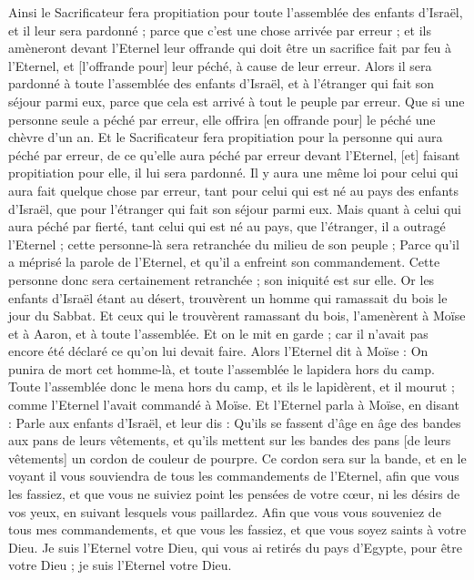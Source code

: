 \begin{multicols}{2}
Ainsi le Sacrificateur fera propitiation pour toute l'assemblée des enfants d'Israël, et il leur sera pardonné ; parce que c'est une chose arrivée par erreur ; et ils amèneront devant l'Eternel leur offrande qui doit être un sacrifice fait par feu à l'Eternel, et [l'offrande pour] leur péché, à cause de leur erreur.
Alors il sera pardonné à toute l'assemblée des enfants d'Israël, et à l'étranger qui fait son séjour parmi eux, parce que cela est arrivé à tout le peuple par erreur.
Que si une personne seule a péché par erreur, elle offrira [en offrande pour] le péché une chèvre d'un an.
Et le Sacrificateur fera propitiation pour la personne qui aura péché par erreur, de ce qu'elle aura péché par erreur devant l'Eternel, [et] faisant propitiation pour elle, il lui sera pardonné.
Il y aura une même loi pour celui qui aura fait quelque chose par erreur, tant pour celui qui est né au pays des enfants d'Israël, que pour l'étranger qui fait son séjour parmi eux.
Mais quant à celui qui aura péché par fierté, tant celui qui est né au pays, que l'étranger, il a outragé l'Eternel ; cette personne-là sera retranchée du milieu de son peuple ;
Parce qu'il a méprisé la parole de l'Eternel, et qu'il a enfreint son commandement. Cette personne donc sera certainement retranchée ; son iniquité est sur elle.
Or les enfants d'Israël étant au désert, trouvèrent un homme qui ramassait du bois le jour du Sabbat.
Et ceux qui le trouvèrent ramassant du bois, l'amenèrent à Moïse et à Aaron, et à toute l'assemblée.
Et on le mit en garde ; car il n'avait pas encore été déclaré ce qu'on lui devait faire.
Alors l'Eternel dit à Moïse : On punira de mort cet homme-là, et toute l'assemblée le lapidera hors du camp.
Toute l'assemblée donc le mena hors du camp, et ils le lapidèrent, et il mourut ; comme l'Eternel l'avait commandé à Moïse.
Et l'Eternel parla à Moïse, en disant :
Parle aux enfants d'Israël, et leur dis : Qu'ils se fassent d'âge en âge des bandes aux pans de leurs vêtements, et qu'ils mettent sur les bandes des pans [de leurs vêtements] un cordon de couleur de pourpre.
Ce cordon sera sur la bande, et en le voyant il vous souviendra de tous les commandements de l'Eternel, afin que vous les fassiez, et que vous ne suiviez point les pensées de votre cœur, ni les désirs de vos yeux, en suivant lesquels vous paillardez.
Afin que vous vous souveniez de tous mes commandements, et que vous les fassiez, et que vous soyez saints à votre Dieu.
Je suis l'Eternel votre Dieu, qui vous ai retirés du pays d'Egypte, pour être votre Dieu ; je suis l'Eternel votre Dieu.

\end{multicols}
